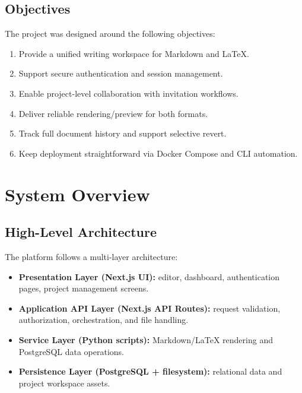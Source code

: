 \documentclass[11pt,a4paper]{article}
\begin{document}
\subsection{Objectives}
The project was designed around the following objectives:
\begin{enumerate}[leftmargin=1.5em]
  \item Provide a unified writing workspace for Markdown and LaTeX.
  \item Support secure authentication and session management.
  \item Enable project-level collaboration with invitation workflows.
  \item Deliver reliable rendering/preview for both formats.
  \item Track full document history and support selective revert.
  \item Keep deployment straightforward via Docker Compose and CLI automation.
\end{enumerate}

\section{System Overview}
\subsection{High-Level Architecture}
The platform follows a multi-layer architecture:
\begin{itemize}[leftmargin=1.5em]
  \item \textbf{Presentation Layer (Next.js UI):} editor, dashboard, authentication pages, project management screens.
  \item \textbf{Application API Layer (Next.js API Routes):} request validation, authorization, orchestration, and file handling.
  \item \textbf{Service Layer (Python scripts):} Markdown/LaTeX rendering and PostgreSQL data operations.
  \item \textbf{Persistence Layer (PostgreSQL + filesystem):} relational data and project workspace assets.
\end{itemize}
\end{document}
